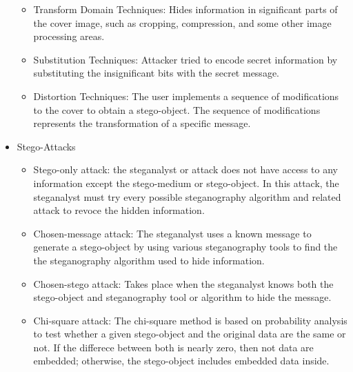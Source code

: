 \begin{itemize}
\begin{itemize}
        \item Transform Domain Techniques: Hides information in significant parts of the cover image, such as cropping, compression, and some other image processing areas.
        \item Substitution Techniques: Attacker tried to encode secret information by substituting the insignificant bits with the secret message.
        \item Distortion Techniques: The user implements a sequence of modifications to the cover to obtain a stego-object. The sequence of modifications represents the transformation of a specific message.
    \end{itemize}
    \item Stego-Attacks
    \begin{itemize}
        \item Stego-only attack: the steganalyst or attack does not have access to any information except the stego-medium or stego-object. In this attack, the steganalyst must try every possible steganography algorithm and related attack to revoce the hidden information.
        \item Chosen-message attack: The steganalyst uses a known message to generate a stego-object by using various steganography tools to find the the steganography algorithm used to hide information.
        \item Chosen-stego attack: Takes place when the steganalyst knows both the stego-object and steganography tool or algorithm to hide the message.
        \item Chi-square attack: The chi-square method is based on probability analysis to test whether a given stego-object and the original data are the same or not. If the differece between both is nearly zero, then not data are embedded; otherwise, the stego-object includes embedded data inside.
    \end{itemize}
\end{itemize}

